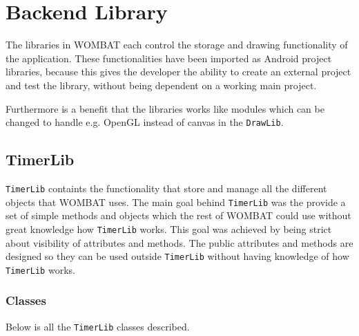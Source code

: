 \section{Backend Library}
\label{sec:backend}
The libraries in WOMBAT each control the storage and drawing functionality of the application.
These functionalities have been imported as Android project libraries, because this gives the developer the ability to create an external project and test the library, without being dependent on a working main project.

Furthermore is a benefit that the libraries works like modules which can be changed to handle e.g. OpenGL instead of canvas in the \texttt{DrawLib}.


\subsection{TimerLib}
\texttt{TimerLib} containts the functionality that store and manage all the different objects that WOMBAT uses. The main goal behind \texttt{TimerLib} was the provide a set of simple methods and objects which the rest of WOMBAT could use without great knowledge how \texttt{TimerLib} works. This goal was achieved by being strict about visibility of attributes and methods. The public attributes and methods are designed so they can be used outside \texttt{TimerLib} without having knowledge of how \texttt{TimerLib} works.

\subsubsection{Classes}
Below is all the \texttt{TimerLib} classes described.

